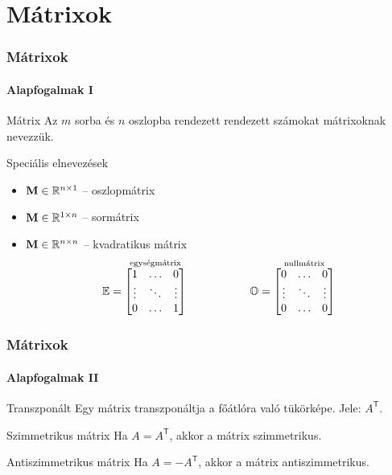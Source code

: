 \section{Mátrixok}
\begin{frame}
  \frametitle{Mátrixok}
  \framesubtitle{Alapfogalmak I}

  \vfill

  \begin{block}{Mátrix}
    Az $m$ sorba és $n$ oszlopba rendezett rendezett számokat mátrixoknak
    nevezzük.
  \end{block}

  \vfill

  \begin{block}{Speciális elnevezések}
    \begin{itemize}
      \item $\mathbf{M} \in \mathbb R^{n \times 1}$ -- oszlopmátrix
      \item $\mathbf{M} \in \mathbb R^{1 \times n}$ -- sormátrix
      \item $\mathbf{M} \in \mathbb R^{n \times n}$ -- kvadratikus mátrix
            \[
              {\mathbb{E}} = \overset{\text{egységmátrix}}{\begin{bmatrix}
                  1      & \dots  & 0      \\
                  \vdots & \ddots & \vdots \\
                  0      & \dots  & 1
                \end{bmatrix}}
              \hspace{2cm}
              {\mathbb{O}} = \overset{\text{nullmátrix}}{\begin{bmatrix}
                  0      & \dots  & 0      \\
                  \vdots & \ddots & \vdots \\
                  0      & \dots  & 0
                \end{bmatrix}}
            \]
    \end{itemize}
  \end{block}

  \vfill
\end{frame}

\begin{frame}
  \frametitle{Mátrixok}
  \framesubtitle{Alapfogalmak II}

  \vfill

  \begin{block}{Transzponált}
    Egy mátrix transzponáltja a főátlóra való tükörképe. Jele: $A^\mathsf T$.
  \end{block}

  \vfill

  \begin{block}{Szimmetrikus mátrix}
    Ha $A = A^\mathsf T$, akkor a mátrix szimmetrikus.
  \end{block}

  \vfill

  \begin{block}{Antiszimmetrikus mátrix}
    Ha $A = -A^\mathsf T$, akkor a mátrix antiszimmetrikus.
  \end{block}

  \vfill
\end{frame}

